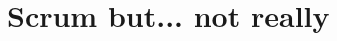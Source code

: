 \documentclass[../report.tex]{subfiles}
\begin{document}
\section{Scrum but... not really}
\end{document}
